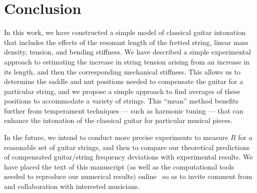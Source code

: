 %
%
%

 \section{Conclusion\label{sct:conc}}

In this work, we have constructed a simple model of classical guitar intonation that includes the effects of the resonant length of the fretted string, linear mass density, tension, and bending stiffness. We have described a simple experimental approach to estimating the increase in string tension arising from an increase in its length, and then the corresponding mechanical stiffness. This allows us to determine the saddle and nut positions needed to compensate the guitar for a particular string, and we propose a simple approach to find averages of these positions to accommodate a variety of strings. This ``mean'' method benefits further from temperament techniques --- such as harmonic tuning --- that can enhance the intonation of the classical guitar for particular musical pieces.

In the future, we intend to conduct more precise experiments to measure $R$ for a reasonable set of guitar strings, and then to compare our theoretical predictions of compensated guitar/string frequency deviations with experimental results. We have placed the text of this manuscript (as well as the computational tools needed to reproduce our numerical results) online~\cite{ref:github2021rgb} so as to invite comment from and collaboration with interested musicians. 
